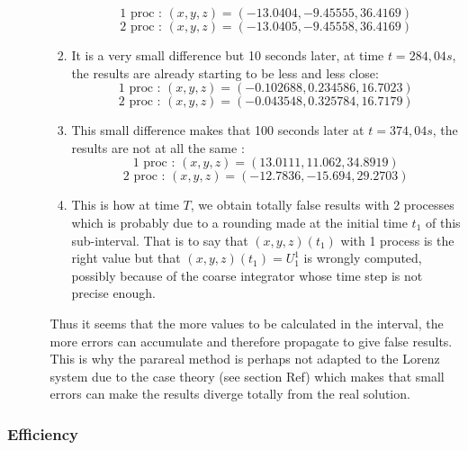 \begin{enumerate}[label=\textbullet]
\begin{itemize}[label=-]
\begin{enumerate}[label=\ding{213}]
			$$\text{1 proc : } (x,y,z)=( -13.0404,-9.45555,36.4169)$$
			$$\text{2 proc : } (x,y,z)=(-13.0405,-9.45558,36.4169)$$
			\item It is a very small difference but 10 seconds later, at time $t=284,04s$, the results are already starting to be less and less close:
			$$\text{1 proc : } (x,y,z)=( -0.102688,0.234586,16.7023)$$
			$$\text{2 proc : } (x,y,z)=(-0.043548,0.325784,16.7179)$$
			\item This small difference makes that 100 seconds later at $t=374,04s$, the results are not at all the same :
			$$\text{1 proc : } (x,y,z)=(13.0111,11.062,34.8919)$$
			$$\text{2 proc : } (x,y,z)=(-12.7836,-15.694,29.2703)$$
			\item This is how at time $T$, we obtain totally false results with 2 processes which is probably due to a rounding made at the initial time $t_1$ of this sub-interval. That is to say that $(x,y,z)(t_1)$ with 1 process is the right value but that $(x,y,z)(t_1)=U_1^1$ is wrongly computed, possibly because of the coarse integrator whose time step is not precise enough.
		\end{enumerate}
		Thus it seems that the more values to be calculated in the interval, the more errors can accumulate and therefore propagate to give false results. This is why the parareal method is perhaps not adapted to the Lorenz system due to the case theory (see section Ref) which makes that small errors can make the results diverge totally from the real solution.
	\end{itemize}
\end{enumerate}


\subsubsection{Efficiency}

